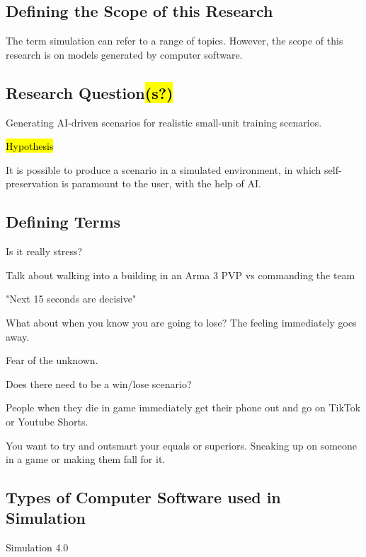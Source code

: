\documentclass{article}
\begin{document}
  \subsection{Defining the Scope of this Research}

  The term simulation can refer to a range of topics. However, the scope of this research is on models generated by computer software.
  
  \subsection{Research Question\hl{(s?)}}
  
  Generating AI-driven scenarios for realistic small-unit training scenarios. 
  
  \hl{Hypothesis}
  
  It is possible to produce a scenario in a simulated environment, in which self-preservation is paramount to the user, with the help of AI.
  
  
  \subsection{Defining Terms}
  

  Is it really stress?

Talk about walking into a building in an Arma 3 PVP vs commanding the team

"Next 15 seconds are decisive"

What about when you know you are going to lose? The feeling immediately goes away. 

Fear of the unknown.

Does there need to be a win/lose scenario? 

People when they die in game immediately get their phone out and go on TikTok or Youtube Shorts.

You want to try and outsmart your equals or superiors. Sneaking up on someone in a game or making them fall for it.

\subsection{Types of Computer Software used in Simulation}

Simulation 4.0 \cite{DEPAULAFERREIRA2020106868}
\end{document}
